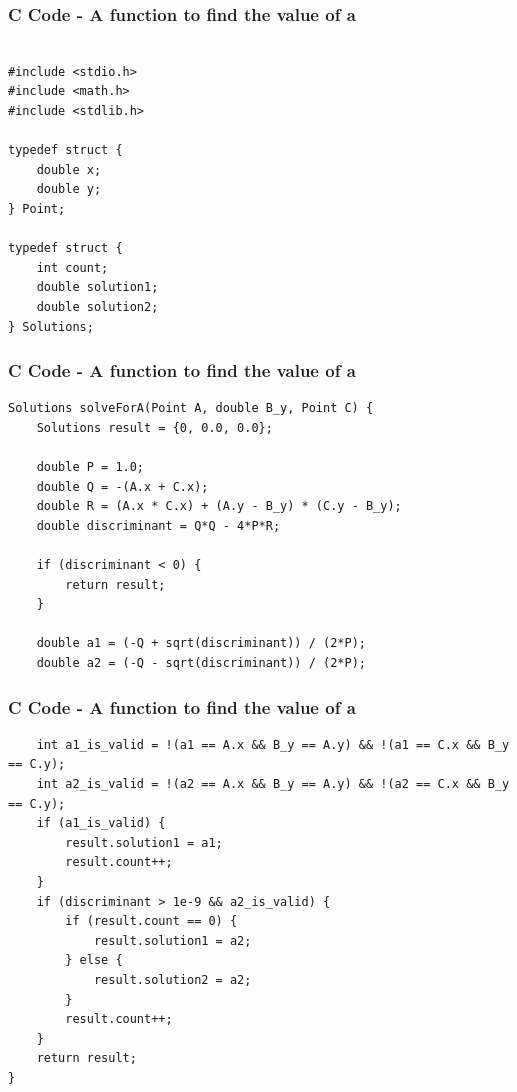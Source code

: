 \documentclass{beamer}
\begin{document}
\begin{frame}[fragile]
    \frametitle{C Code - A function to find the value of a}

    \begin{lstlisting}

#include <stdio.h>
#include <math.h>
#include <stdlib.h>

typedef struct {
    double x;
    double y;
} Point;

typedef struct {
    int count;
    double solution1;
    double solution2;
} Solutions;

    \end{lstlisting}
\end{frame}

\begin{frame}[fragile]
    \frametitle{C Code - A function to find the value of a}

    \begin{lstlisting}
Solutions solveForA(Point A, double B_y, Point C) {
    Solutions result = {0, 0.0, 0.0};
    
    double P = 1.0;
    double Q = -(A.x + C.x);
    double R = (A.x * C.x) + (A.y - B_y) * (C.y - B_y);
    double discriminant = Q*Q - 4*P*R;

    if (discriminant < 0) {
        return result;
    }

    double a1 = (-Q + sqrt(discriminant)) / (2*P);
    double a2 = (-Q - sqrt(discriminant)) / (2*P);

    \end{lstlisting}
\end{frame}

\begin{frame}[fragile]
    \frametitle{C Code - A function to find the value of a}

    \begin{lstlisting}
    int a1_is_valid = !(a1 == A.x && B_y == A.y) && !(a1 == C.x && B_y == C.y);
    int a2_is_valid = !(a2 == A.x && B_y == A.y) && !(a2 == C.x && B_y == C.y);
    if (a1_is_valid) {
        result.solution1 = a1;
        result.count++;
    }   
    if (discriminant > 1e-9 && a2_is_valid) {
        if (result.count == 0) {
            result.solution1 = a2;
        } else {
            result.solution2 = a2;
        }
        result.count++;
    }
    return result;
}

    \end{lstlisting}
\end{frame}
\end{document}
